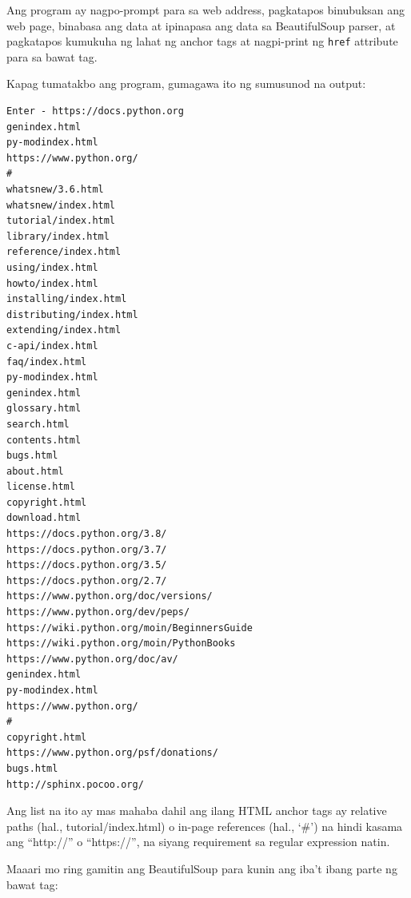 \documentclass[10pt,]{book}
\begin{document}
Ang program ay nagpo-prompt para sa web address, pagkatapos binubuksan
ang web page, binabasa ang data at ipinapasa ang data sa BeautifulSoup
parser, at pagkatapos kumukuha ng lahat ng anchor tags at nagpi-print ng
\texttt{href} attribute para sa bawat tag.

Kapag tumatakbo ang program, gumagawa ito ng sumusunod na output:

{\small
\begin{verbatim}
Enter - https://docs.python.org
genindex.html
py-modindex.html
https://www.python.org/
#
whatsnew/3.6.html
whatsnew/index.html
tutorial/index.html
library/index.html
reference/index.html
using/index.html
howto/index.html
installing/index.html
distributing/index.html
extending/index.html
c-api/index.html
faq/index.html
py-modindex.html
genindex.html
glossary.html
search.html
contents.html
bugs.html
about.html
license.html
copyright.html
download.html
https://docs.python.org/3.8/
https://docs.python.org/3.7/
https://docs.python.org/3.5/
https://docs.python.org/2.7/
https://www.python.org/doc/versions/
https://www.python.org/dev/peps/
https://wiki.python.org/moin/BeginnersGuide
https://wiki.python.org/moin/PythonBooks
https://www.python.org/doc/av/
genindex.html
py-modindex.html
https://www.python.org/
#
copyright.html
https://www.python.org/psf/donations/
bugs.html
http://sphinx.pocoo.org/
\end{verbatim}
}

Ang list na ito ay mas mahaba dahil ang ilang HTML anchor tags ay
relative paths (hal., tutorial/index.html) o in-page references (hal.,
`\#') na hindi kasama ang ``http://'' o ``https://'', na siyang
requirement sa regular expression natin.

Maaari mo ring gamitin ang BeautifulSoup para kunin ang iba't ibang
parte ng bawat tag:
\end{document}
